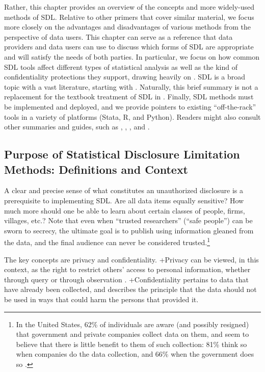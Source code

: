 \documentclass[
]{WileySix}
\begin{document}
Rather, this chapter provides an overview of the concepts and more widely-used methods of SDL. Relative to other primers that cover similar material, we focus more closely on the advantages and disadvantages of various methods from the perspective of data users. This chapter can serve as a reference that data providers and data users can use to discuss which forms of SDL are appropriate and will satisfy the needs of both parties. In particular, we focus on how common SDL tools affect different types of statistical analysis as well as the kind of confidentiality protections they support, drawing heavily on \citet{abowd_economic_2015}. SDL is a broad topic with a vast literature, starting with \citet{fellegi_question_1972}. Naturally, this brief summary is not a replacement for the textbook treatment of SDL in \citet{duncan_statistical_2011}. Finally, SDL methods must be implemented and deployed, and we provide pointers to existing ``off-the-rack'' tools in a variety of platforms (Stata, R, and Python). Readers might also consult other summaries and guides, such as \citet{dupriez_dissemination_2010}, \citet{world_bank_dime_nodate}, \citet{kopper_j-pal_2020}, and \citet{liu_statistical_2020}.

\hypertarget{purpose-of-statistical-disclosure-limitation-methods-definitions-and-context}{%
\subsection{Purpose of Statistical Disclosure Limitation Methods: Definitions and Context}\label{purpose-of-statistical-disclosure-limitation-methods-definitions-and-context}}

A clear and precise sense of what constitutes an unauthorized disclosure is a prerequisite to implementing SDL. Are all data items equally sensitive? How much more should one be able to learn about certain classes of people, firms, villages, etc.? Note that even when ``trusted researchers'' (``safe people'') can be sworn to secrecy, the ultimate goal is to publish using information gleaned from the data, and the final audience can never be considered trusted.\footnote{In the United States, 62\% of individuals are aware (and possibly resigned) that government and private companies collect data on them, and seem to believe that there is little benefit to them of such collection: 81\% think so when companies do the data collection, and 66\% when the government does so \citep{auxier_americans_2019}.}

The key concepts are privacy and confidentiality. +Privacy\textbar{} can be viewed, in this context, as the right to restrict others' access to personal information, whether through query or through observation \citep{hirshleifer_privacy_1980}. +Confidentiality\textbar{} pertains to data that have already been collected, and describes the principle that the data should not be used in ways that could harm the persons that provided it.
\end{document}
